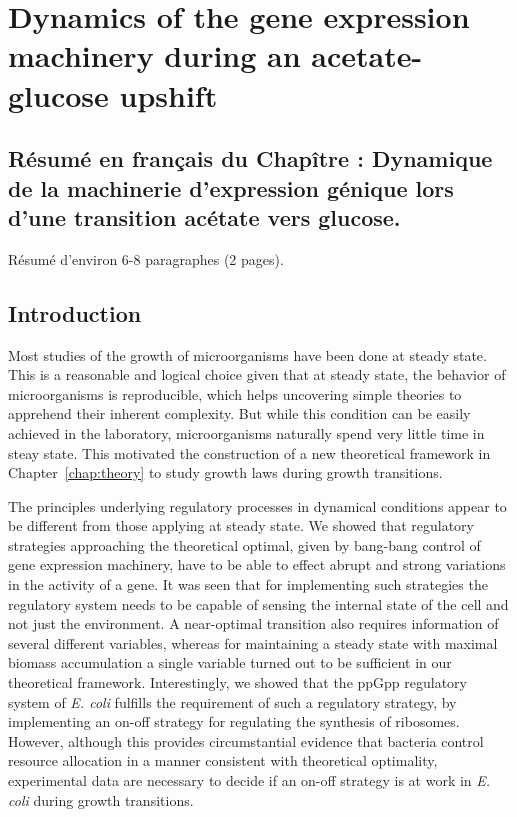 \chapter{Dynamics of the gene expression machinery during an acetate-glucose upshift}
\label{chap:experiments}


\section*{Résumé en français du Chapître \thechapter : Dynamique de la machinerie d'expression génique lors d'une transition acétate vers glucose.}

Résumé d'environ 6-8 paragraphes (2 pages).

\section{Introduction}

Most studies of the growth of microorganisms have been done at steady state.
This is a reasonable and logical choice given that at steady state, the behavior of microorganisms is reproducible, which helps uncovering simple theories to apprehend their inherent complexity.
But while this condition can be easily achieved in the laboratory, microorganisms naturally spend very little time in steay state.
This motivated the construction of a new theoretical framework in Chapter~\ref{chap:theory} to study growth laws during growth transitions.

The principles underlying regulatory processes in dynamical conditions appear to be different from those applying at steady state.
We showed that regulatory strategies approaching the theoretical optimal, given by bang-bang control of gene expression machinery, have to be able to effect abrupt and strong variations in the activity of a gene.
It was seen that for implementing such strategies the regulatory system needs to be capable of sensing the internal state of the cell and not just the environment.
A near-optimal transition also requires information of several different variables, whereas for maintaining a steady state with maximal biomass accumulation a single variable turned out to be sufficient in our theoretical framework.
Interestingly, we showed that the ppGpp regulatory system of \textit{E. coli} fulfills the requirement of such a regulatory strategy, by implementing an on-off strategy for regulating the synthesis of ribosomes.
However, although this provides circumstantial evidence that bacteria control resource allocation in a manner consistent with theoretical optimality, experimental data are necessary to decide if an on-off strategy is at work in \textit{E. coli} during growth transitions.

